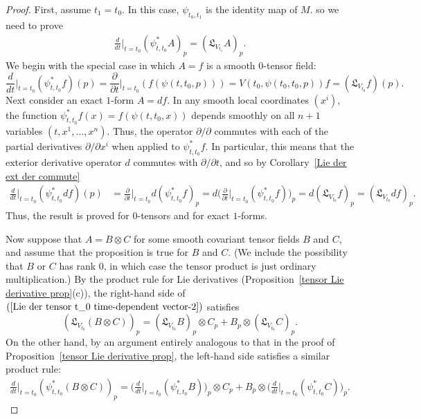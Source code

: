 \begin{proof}
First, assume $t_1=t_0$. In this case, $\psi_{t_0,t_1}$ is the identity map of $M$. so we need to prove
\begin{align}\label{Lie der tensor t_0 time-dependent vector-2}
\frac{d}{dt}\Big|_{t=t_0}(\psi_{t,t_0}^*A)_p=(\mathfrak{L}_{V_{t_1}}A)_p.
\end{align}
We begin with the special case in which $A=f$ is a smooth $0$-tensor field:
\[\frac{d}{dt}\Big|_{t=t_0}(\psi_{t,t_0}^*f)(p)=\frac{\partial}{\partial t}\Big|_{t=t_0}(f(\psi(t,t_0,p)))=V(t_0,\psi(t_0,t_0,p))f=(\mathfrak{L}_{V_{t_0}}f)(p).\]
Next consider an exact $1$-form $A=df$. In any smooth local coordinates $(x^i)$, the function $\psi^*_{t,t_0}f(x)=f(\psi(t,t_0,x))$ depends smoothly on all $n+1$ variables $(t,x^1,\dots,x^n)$. Thus, the operator $\partial/\partial$ commutes with each of the partial derivatives $\partial/\partial x^i$ when applied to $\psi^*_{t,t_0}f$. In particular, this means that the exterior derivative operator $d$ commutes with $\partial/\partial t$, and so by Corollary~\ref{Lie der ext der commute}
\begin{align*}
\frac{d}{dt}\Big|_{t=t_0}(\psi_{t,t_0}^*df)(p)&=\frac{\partial}{\partial t}\Big|_{t=t_0}d(\psi_{t,t_0}^*f)_p=d\Big(\frac{\partial}{\partial t}\Big|_{t=t_0}(\psi^*_{t,t_0}f)\Big)_p=d(\mathfrak{L}_{V_{t_0}}f)_p=(\mathfrak{L}_{V_{t_0}}df)_p.
\end{align*}
Thus, the result is proved for $0$-tensors and for exact $1$-forms.\par
Now suppose that $A=B\otimes C$ for some smooth covariant tensor fields $B$ and $C$, and assume that the proposition is true for $B$ and $C$. (We include the possibility that $B$ or $C$ has rank $0$, in which case the tensor product is just ordinary multiplication.) By the product rule for Lie derivatives (Proposition~\ref{tensor Lie derivative prop}(c)), the right-hand side of $(\ref{Lie der tensor t_0 time-dependent vector-2})$ satisfies
\[(\mathfrak{L}_{V_{t_0}}(B\otimes C))_p=(\mathfrak{L}_{V_{t_0}}B)_p\otimes C_p+B_p\otimes(\mathfrak{L}_{V_{t_0}}C)_p.\]
On the other hand, by an argument entirely analogous to that in the proof of Proposition~\ref{tensor Lie derivative prop}, the left-hand side satisfies a similar product rule:
\begin{align*}
\frac{d}{dt}\Big|_{t=t_0}(\psi_{t,t_0}^*(B\otimes C))_p=\Big(\frac{d}{dt}\Big|_{t=t_0}(\psi_{t,t_0}^*B)\Big)_p\otimes C_p+B_p\otimes\Big(\frac{d}{dt}\Big|_{t=t_0}(\psi_{t,t_0}^*C)\Big)_p.
\end{align*}

\end{proof}
